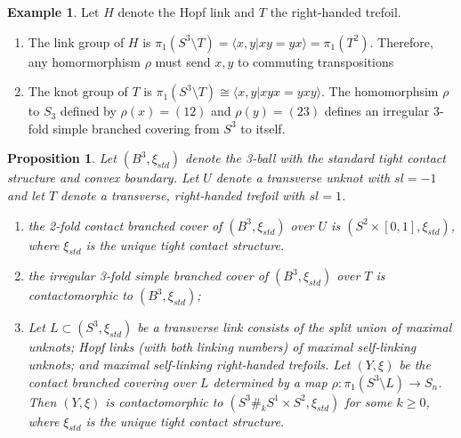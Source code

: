 \documentclass[11pt]{amsart}
\newtheorem{proposition}[theorem]{Proposition}
\theoremstyle{definition}
\newtheorem{example}[theorem]{Example}
\theoremstyle{remark}
\numberwithin{equation}{section}
\begin{document}
\begin{example}
Let $H$ denote the Hopf link and $T$ the right-handed trefoil.
\begin{enumerate}
    \item The link group of $H$ is $\pi_1(S^3 \setminus T) = \langle x,y | xy = yx \rangle = \pi_1(T^2)$.  Therefore, any homormorphism $\rho$ must send $x,y$ to commuting transpositions
    \item The knot group of $T$ is $\pi_1(S^3 \setminus T) \cong \langle x,y | xyx = yxy \rangle$.  The homomorphsim $\rho$ to $S_3$ defined by $\rho(x) = (12)$ and $\rho(y) = (23)$ defines an irregular 3-fold simple branched covering from $S^3$ to itself.
\end{enumerate}
\end{example}

\begin{proposition}
Let $(B^3,\xi_{std})$ denote the 3-ball with the standard tight contact structure and convex boundary.  Let $U$ denote a transverse unknot with $sl = -1$ and let $T$ denote a transverse, right-handed trefoil with $sl = 1$.
\begin{enumerate}
\item the 2-fold contact branched cover of $(B^3,\xi_{std})$ over $U$ is $(S^2 \times [0,1],\xi_{std})$, where $\xi_{std}$ is the unique tight contact structure.
\item the irregular 3-fold simple branched cover of $(B^3,\xi_{std})$ over $T$ is contactomorphic to $(B^3,\xi_{std})$;
\item Let $L \subset (S^3,\xi_{std})$ be a transverse link consists of the split union of maximal unknots; Hopf links (with both linking numbers) of maximal self-linking unknots; and maximal self-linking right-handed trefoils.  Let $(Y,\xi)$ be the contact branched covering over $L$ determined by a map $\rho: \pi_1(S^3 \setminus L) \rightarrow S_n$.  Then $(Y,\xi)$ is contactomorphic to $(S^3 \#_k S^1 \times S^2,\xi_{std})$ for some $k \geq 0$, where $\xi_{std}$ is the unique tight contact structure.
\end{enumerate}

\end{proposition}
\end{document}
